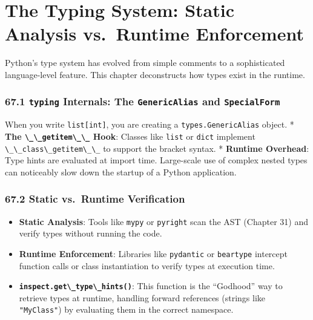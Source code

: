 \hypertarget{the-typing-system-static-analysis-vs.-runtime-enforcement}{%
\chapter{The Typing System: Static Analysis vs.~Runtime
Enforcement}\label{the-typing-system-static-analysis-vs.-runtime-enforcement}}

Python's type system has evolved from simple comments to a sophisticated
language-level feature. This chapter deconstructs how types exist in the
runtime.

\hypertarget{typing-internals-the-genericalias-and-specialform}{%
\subsection{\texorpdfstring{67.1 \texttt{typing} Internals: The
\texttt{GenericAlias} and
\texttt{SpecialForm}}{67.1 typing Internals: The GenericAlias and SpecialForm}}\label{typing-internals-the-genericalias-and-specialform}}

When you write \passthrough{\lstinline!list[int]!}, you are creating a
\passthrough{\lstinline!types.GenericAlias!} object. * \textbf{The
\passthrough{\lstinline!\_\_getitem\_\_!} Hook}: Classes like
\passthrough{\lstinline!list!} or \passthrough{\lstinline!dict!}
implement \passthrough{\lstinline!\_\_class\_getitem\_\_!} to support
the bracket syntax. * \textbf{Runtime Overhead}: Type hints are
evaluated at import time. Large-scale use of complex nested types can
noticeably slow down the startup of a Python application.

\hypertarget{static-vs.-runtime-verification}{%
\subsection{67.2 Static vs.~Runtime
Verification}\label{static-vs.-runtime-verification}}

\begin{itemize}
\tightlist
\item
  \textbf{Static Analysis}: Tools like \passthrough{\lstinline!mypy!} or
  \passthrough{\lstinline!pyright!} scan the AST (Chapter 31) and verify
  types without running the code.
\item
  \textbf{Runtime Enforcement}: Libraries like
  \passthrough{\lstinline!pydantic!} or
  \passthrough{\lstinline!beartype!} intercept function calls or class
  instantiation to verify types at execution time.
\item
  \textbf{\passthrough{\lstinline!inspect.get\_type\_hints()!}}: This
  function is the ``Godhood'' way to retrieve types at runtime, handling
  forward references (strings like \passthrough{\lstinline!"MyClass"!})
  by evaluating them in the correct namespace.
\end{itemize}

